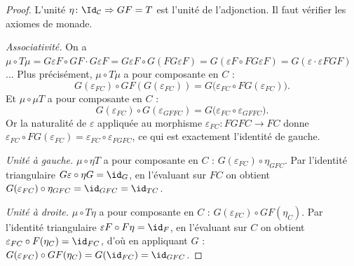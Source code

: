 \begin{proof}
L'unité $\eta \colon \Id_{\mathcal{C}} \Rightarrow GF = T$ est
l'unité de l'adjonction. Il faut vérifier les axiomes de monade.

\emph{Associativité.}
On a $\mu \circ T\mu = G\varepsilon F \circ GF \cdot G\varepsilon F
= G\varepsilon F \circ G(F G\varepsilon F)
= G(\varepsilon F \circ FG\varepsilon F)
= G(\varepsilon \cdot \varepsilon FGF)$... Plus précisément,
$\mu \circ T\mu$ a pour composante en $C$ :
\[
    G(\varepsilon_{FC}) \circ GF(G(\varepsilon_{FC}))
    = G\bigl(\varepsilon_{FC} \circ F G(\varepsilon_{FC})\bigr).
\]
Et $\mu \circ \mu T$ a pour composante en $C$ :
\[
    G(\varepsilon_{FC}) \circ G(\varepsilon_{GFFC})
    = G\bigl(\varepsilon_{FC} \circ \varepsilon_{GFFC}\bigr).
\]
Or la naturalité de $\varepsilon$ appliquée au morphisme
$\varepsilon_{FC} \colon FGFC \to FC$ donne
$\varepsilon_{FC} \circ FG(\varepsilon_{FC})
= \varepsilon_{FC} \circ \varepsilon_{FGFC}$,
ce qui est exactement l'identité de gauche.

\emph{Unité à gauche.}
$\mu \circ \eta T$ a pour composante en $C$ :
$G(\varepsilon_{FC}) \circ \eta_{GFC}$.
Par l'identité triangulaire $G\varepsilon \circ \eta G = \id_G$,
en l'évaluant sur $FC$ on obtient
$G(\varepsilon_{FC}) \circ \eta_{GFC} = \id_{GFC} = \id_{TC}$.

\emph{Unité à droite.}
$\mu \circ T\eta$ a pour composante en $C$ :
$G(\varepsilon_{FC}) \circ GF(\eta_C)$.
Par l'identité triangulaire $\varepsilon F \circ F\eta = \id_F$,
en l'évaluant sur $C$ on obtient
$\varepsilon_{FC} \circ F(\eta_C) = \id_{FC}$,
d'où en appliquant $G$ :
$G(\varepsilon_{FC}) \circ GF(\eta_C) = G(\id_{FC}) = \id_{GFC}$.
\end{proof}

